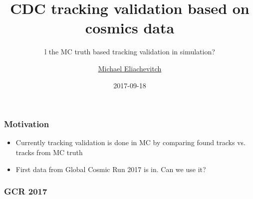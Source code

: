 \documentclass[18pt]{beamer}
\title{CDC tracking validation based on cosmics data}
\subtitle{l the MC truth based tracking validation in simulation?}
\author{\underline{Michael Eliachevitch}}
\date{2017-09-18}
\institute{ETP - KIT}
\begin{document}
  
  \begin{frame}
  \titlepage
  \end{frame}

  \begin{frame}
    \frametitle{Motivation}
    \begin{itemize}
    \item Currently tracking validation is done in MC by comparing found tracks vs. tracks from MC truth
    \item First data from Global Cosmic Run 2017 is in. Can we use it? 
      
    \end{itemize}
  \end{frame}

  \begin{frame}
    \frametitle{GCR 2017}
    
  \end{frame}

  
\end{document}
